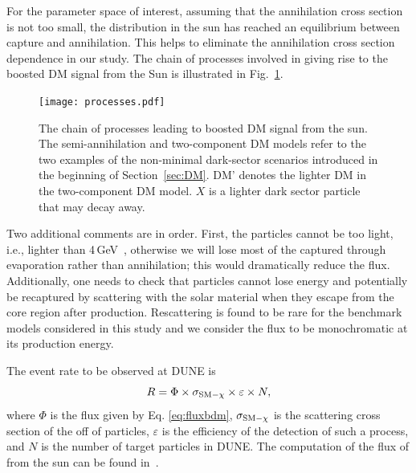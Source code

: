 For the parameter space of interest, %
assuming that the 
 annihilation cross section is not too small, the  distribution in the sun has reached an equilibrium between capture and annihilation. This helps to eliminate the annihilation cross section dependence in our study. The chain of processes involved in giving rise to the boosted DM signal from the Sun is illustrated in Fig.~\ref{fig:processes}.
\begin{figure}[h!]
  \centering
  \texttt{[image: processes.pdf]}
  \caption[Processes leading to boosted DM signal from the sun]{The chain of processes leading to boosted DM signal from the sun. The semi-annihilation and two-component DM models refer to the two examples of the non-minimal dark-sector scenarios introduced in the beginning of Section~\ref{sec:DM}. DM' denotes the lighter DM in the two-component DM model. $X$ is a lighter dark sector particle that may decay away.}
    \label{fig:processes}
\end{figure}

Two additional comments are in order. First, the  particles cannot be too light, i.e.,  lighter than 4\,GeV~\cite{Griest:1986yu,Gould:1987ju}, otherwise we will lose most of the captured  through evaporation rather than annihilation; this would dramatically reduce the  flux. Additionally, one needs to check that  particles cannot lose energy and potentially be recaptured by scattering with the solar material when they escape from the core region after production. Rescattering is found to be rare for the benchmark models considered in this study and we consider the  flux to be monochromatic at its production energy.

The event rate to be observed at DUNE is 
\begin{equation}
R = \Phi \times \sigma_{\rm{SM} - \chi} \times \varepsilon \times N,
\end{equation}
 where $\Phi$ is the flux given by Eq. \eqref{eq:fluxbdm}, $\sigma_{\rm{SM} - \chi}$ is the scattering cross section of the  off of  particles, $\varepsilon$ is the efficiency of the detection of such a process, and $N$ is the number of target particles in DUNE. The computation of the flux of  from the sun can be found in~\cite{Berger:2014sqa}. 

